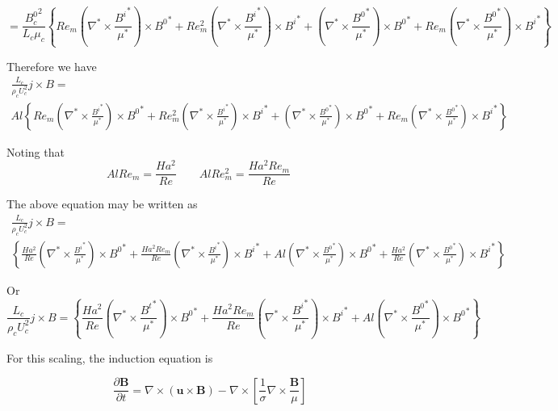\documentclass[11pt]{article}
\begin{document}
\begin{equation}
	=
	\frac{{B_c^0}^2}{L_c \mu_c}
	\left\{
	Re_m \left( \nabla^* \times \frac{{B^{i}}^*}{\mu^*} \right) \times {B^0}^*
	+
	Re_m^2 \left( \nabla^* \times \frac{{B^{i}}^*}{\mu^*} \right) \times {B^{i}}^*
	+
	\left( \nabla^* \times \frac{{B^0}^*}{\mu^*} \right) \times {B^0}^*
	+
	Re_m \left( \nabla^* \times \frac{{B^0}^*}{\mu^*} \right) \times {B^{i}}^*
	\right\}
\end{equation}

Therefore we have
\begin{multline}
	 \frac{L_c}{\rho_c U_c^2} j \times B
	 = \\
	 Al
	\left\{
	Re_m \left( \nabla^* \times \frac{{B^{i}}^*}{\mu^*} \right) \times {B^0}^*
	+
	Re_m^2 \left( \nabla^* \times \frac{{B^{i}}^*}{\mu^*} \right) \times {B^{i}}^*
	+
	\left( \nabla^* \times \frac{{B^0}^*}{\mu^*} \right) \times {B^0}^*
	+
	Re_m \left( \nabla^* \times \frac{{B^0}^*}{\mu^*} \right) \times {B^{i}}^*
	\right\}
\end{multline}

Noting that
\begin{equation}
	Al Re_m = \frac{Ha^2}{Re} \qquad
	Al Re_m^2 = \frac{Ha^2 Re_m}{Re} \qquad
\end{equation}

The above equation may be written as
\begin{multline}
	 \frac{L_c}{\rho_c U_c^2} j \times B
	 = \\
	\left\{
	\frac{Ha^2}{Re} \left( \nabla^* \times \frac{{B^{i}}^*}{\mu^*} \right) \times {B^0}^*
	+
	\frac{Ha^2 Re_m}{Re} \left( \nabla^* \times \frac{{B^{i}}^*}{\mu^*} \right) \times {B^{i}}^*
	+
	Al \left( \nabla^* \times \frac{{B^0}^*}{\mu^*} \right) \times {B^0}^*
	+
	\frac{Ha^2}{Re} \left( \nabla^* \times \frac{{B^0}^*}{\mu^*} \right) \times {B^{i}}^*
	\right\}
\end{multline}

Or
\begin{equation}
	 \frac{L_c}{\rho_c U_c^2} j \times B
	 =
	\left\{
	\frac{Ha^2}{Re} \left( \nabla^* \times \frac{{B^{t}}^*}{\mu^*} \right) \times {B^0}^*
	+
	\frac{Ha^2 Re_m}{Re} \left( \nabla^* \times \frac{{B^{i}}^*}{\mu^*} \right) \times {B^{i}}^*
	+
	Al \left( \nabla^* \times \frac{{B^0}^*}{\mu^*} \right) \times {B^0}^*
	\right\}
\end{equation}


For this scaling, the induction equation is

\begin{equation}
	\frac{\partial \pmb{B}}{\partial t} = 
	\nabla \times (\pmb{u} \times \pmb{B})
	- \nabla \times 
	\left[ \frac{1}{\sigma}
	\nabla \times \frac{\pmb{B}}{\mu} \right]
\end{equation}
\end{document}
